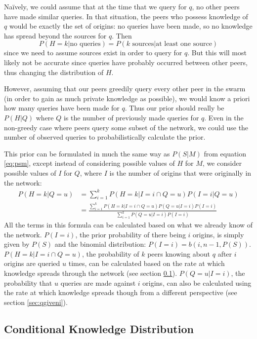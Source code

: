 \documentclass{article}
\newcommand{\eqnref}[1]{equation \eqref{eq:#1}}
\newcommand{\secref}[1]{section \ref{sec:#1}}
\begin{document}
Na\"ively, we could assume that at the time that we query for $q$, no other
peers have made similar queries. In that situation, the peers who
possess knowledge of $q$ would be exactly the set of origins: no queries have
been made, so no knowledge has spread beyond the sources for $q$. Then
\begin{equation*}
	P(H=k|\text{no queries})=P(k\text{ sources}|\text{at least one
	source})
\end{equation*}
since we need to assume sources exist in order to query for $q$. But this will
most likely not be accurate since queries have probably occurred between other
peers, thus changing the distribution of $H$.

However, assuming that our peers greedily query every other peer in the swarm
(in order to gain as much private knowledge as possible), we would know a priori
how many queries have been made for $q$. Thus our prior should really be
$P(H|Q)$ where $Q$ is the number of previously made queries for $q$. Even in the
non-greedy case where peers query some subset of the network, we could use the
number of observed queries to probabilistically calculate the prior.


This prior can be formulated in much the same way as $P(S|M)$ from \eqnref{psm},
except instead of considering possible values of $H$ for $M$, we consider possible
values of $I$ for $Q$, where $I$ is the number of origins that were originally in the network:
\begin{align}
	P(H=k|Q=u)&=\sum_{i=1}^kP(H=k|I=i\cap Q=u)P(I=i|Q=u)\nonumber\\
	&=\frac{\sum_{i=1}^kP(H=k|I=i\cap
	Q=u)P(Q=u|I=i)P(I=i)}{\sum_{i=1}^{k}P(Q=u|I=i)P(I=i)}\label{eq:hgq}
\end{align}
All the terms in this formula can be calculated based on what we already know of
the network. $P(I=i)$, the prior probability of
there being $i$ origins, is simply given by $P(S)$ and the binomial
distribution: $P(I=i)=b(i,n-1,P(S))$. $P(H=k|I=i\cap Q=u)$, the probability of
$k$ peers knowing about $q$ after $i$ origins are queried $u$ times, can
be calculated based on the rate at which knowledge spreads through the network
(see \secref{hgiveniq}). $P(Q=u|I=i)$, the probability that $u$ queries are made
against $i$ origins, can also be calculated using the rate at which
knowledge spreads though from a different perspective (see \secref{qgiveni}).

\subsection{Conditional Knowledge Distribution}\label{sec:hgiveniq}
\end{document}
